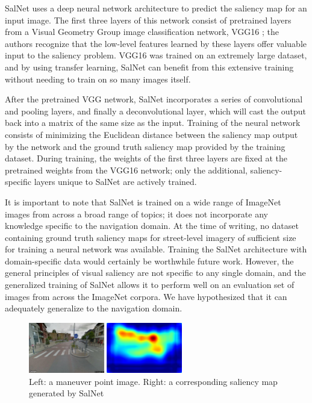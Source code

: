 SalNet uses a deep neural network architecture to predict the saliency map for an input image. The first three layers of this network consist of pretrained layers from a Visual Geometry Group image classification network, VGG16 \cite{Simonyan14c}; the authors recognize that the low-level features learned by these layers offer valuable input to the saliency problem. VGG16 was trained on an extremely large dataset, and by using transfer learning, SalNet can benefit from this extensive training without needing to train on so many images itself. 

After the pretrained VGG network, SalNet incorporates a series of convolutional and pooling layers, and finally a deconvolutional layer, which will cast the output back into a matrix of the same size as the input. Training of the neural network consists of minimizing the Euclidean distance between the saliency map output by the network and the ground truth saliency map provided by the training dataset. During training, the weights of the first three layers are fixed at the pretrained weights from the VGG16 network; only the additional, saliency-specific layers unique to SalNet are actively trained.

It is important to note that SalNet is trained on a wide range of ImageNet images from across a broad range of topics; it does not incorporate any knowledge specific to the navigation domain. At the time of writing, no dataset containing ground truth saliency maps for street-level imagery of sufficient size for training a neural network was available. Training the SalNet architecture with domain-specific data would certainly be worthwhile future work. However, the general principles of visual saliency are not specific to any single domain, and the generalized training of SalNet allows it to perform well on an evaluation set of images from across the ImageNet corpora. We have hypothesized that it can adequately generalize to the navigation domain.

\begin{figure}[htbp]
  \centering
  \includegraphics[width=0.6\textwidth]{images/saliencyMap.png}
  \caption{Left: a maneuver point image. Right: a corresponding saliency map generated by SalNet}
  \label{fig:saliencyMap}
\end{figure}

